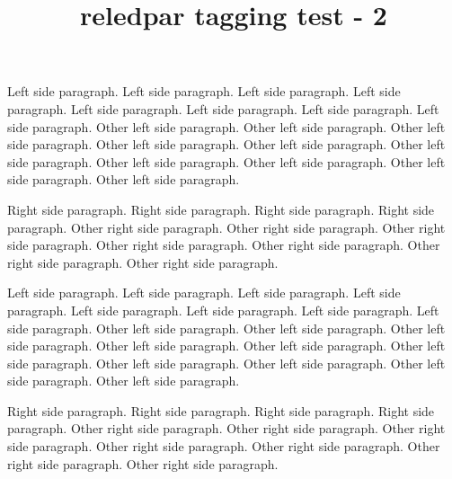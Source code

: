 \documentclass{article}
\title{reledpar tagging test - 2}
\begin{document}
\begin{pairs}
    \begin{Leftside}
        \beginnumbering
            \pstart
                Left side paragraph. Left side paragraph. Left side paragraph. Left side paragraph. Left side paragraph. Left side paragraph. Left side paragraph. Left side paragraph.
            \pend
            \pstart
                Other left side paragraph.  Other left side paragraph.  Other left side paragraph.  Other left side paragraph.  Other left side paragraph.  Other left side paragraph.  Other left side paragraph.  Other left side paragraph.  Other left side paragraph.  Other left side paragraph.
            \pend
        \endnumbering
    \end{Leftside}
    \begin{Rightside}
        \beginnumbering
            \pstart
                Right side paragraph. Right side paragraph. Right side paragraph. Right side paragraph.
            \pend
            \pstart
                Other right side paragraph. Other right side paragraph. Other right side paragraph. Other right side paragraph. Other right side paragraph. Other right side paragraph. Other right side paragraph.
            \pend
        \endnumbering
    \end{Rightside}

\end{pairs}
\Columns

\begin{pages}
    \begin{Leftside}
        \beginnumbering
            \pstart
                Left side paragraph. Left side paragraph. Left side paragraph. Left side paragraph. Left side paragraph. Left side paragraph. Left side paragraph. Left side paragraph.
            \pend
            \pstart
                Other left side paragraph.  Other left side paragraph.  Other left side paragraph.  Other left side paragraph.  Other left side paragraph.  Other left side paragraph.  Other left side paragraph.  Other left side paragraph.  Other left side paragraph.  Other left side paragraph.
            \pend
        \endnumbering
    \end{Leftside}
    \begin{Rightside}
        \beginnumbering
            \pstart
                Right side paragraph. Right side paragraph. Right side paragraph. Right side paragraph.
            \pend
            \pstart
                Other right side paragraph. Other right side paragraph. Other right side paragraph. Other right side paragraph. Other right side paragraph. Other right side paragraph. Other right side paragraph.
            \pend
        \endnumbering
    \end{Rightside}

\end{pages}
\Pages
\end{document}
